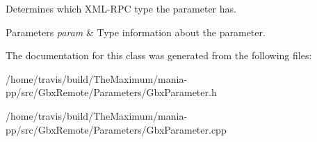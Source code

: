 Determines which X\-M\-L-\/\-R\-P\-C type the parameter has. 


\begin{DoxyParams}{Parameters}
{\em param} & Type information about the parameter. \\
\hline
\end{DoxyParams}


The documentation for this class was generated from the following files\-:\begin{DoxyCompactItemize}
\item 
/home/travis/build/\-The\-Maximum/mania-\/pp/src/\-Gbx\-Remote/\-Parameters/Gbx\-Parameter.\-h\item 
/home/travis/build/\-The\-Maximum/mania-\/pp/src/\-Gbx\-Remote/\-Parameters/Gbx\-Parameter.\-cpp\end{DoxyCompactItemize}

